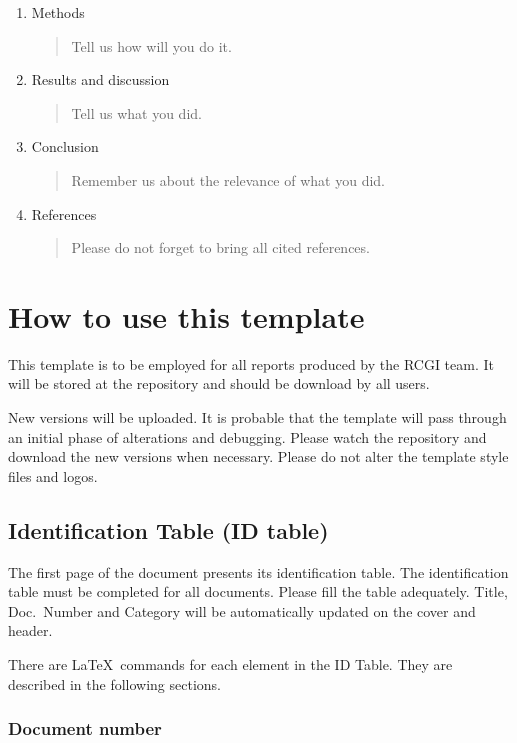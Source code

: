 \begin{enumerate}
    \item Methods
    \begin{quote} Tell us how will you do it. \end{quote}
    \item Results and discussion
    \begin{quote} Tell us what you did. \end{quote}
    \item Conclusion
    \begin{quote} 
    Remember us about the relevance of what you did.
    \end{quote}
    \item References
    \begin{quote}
    Please do not forget to bring all cited references.
    \end{quote}
\end{enumerate}

\section{How to use this template}

This template is to be employed for all reports produced by the RCGI team. It will be stored at the repository and should be download by all users. 

New versions will be uploaded. It is probable that the template will pass through an initial phase of alterations and debugging. Please watch the repository and download the new versions when necessary. Please do not alter the template style files and logos.

\subsection{Identification Table (ID table)}

The first page of the document presents its identification table. The identification table must be completed for all documents. Please fill the table adequately. Title, Doc.\ Number and Category will be automatically updated on the cover and header. 

There are \LaTeX\ commands for each element in the ID Table. They are described in the following sections.

\subsubsection{Document number}

